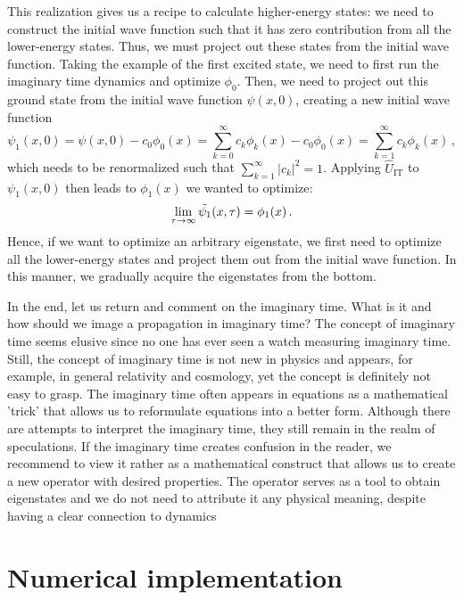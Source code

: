 This realization gives us a recipe to calculate higher-energy states: we need to construct the initial wave function such that it has zero contribution from all the lower-energy states. Thus, we must project out these states from the initial wave function. Taking the example of the first excited state, we need to first run the imaginary time dynamics and optimize $\phi_0$. Then, we need to project out this ground state from the initial wave function $\psi(x,0)$, creating a new initial wave function
\begin{equation}
    \psi_1(x,0) = \psi(x,0) - c_0 \phi_0(x) = \sum_{k=0}^\infty c_k \phi_k(x) - c_0 \phi_0(x) = \sum_{k=1}^\infty c_k \phi_k(x) \, ,
\end{equation}
which needs to be renormalized such that $\sum_{k=1}^\infty |c_k|^2 = 1$. Applying $\hat{U}_\mathrm{IT}$ to $\psi_1(x,0)$ then leads to $\phi_1(x)$ we wanted to optimize:
\begin{equation}
    \lim_{\tau\to\infty} \Tilde{\psi_1}(x,\tau) = \phi_1(x) \, .
\end{equation}
Hence, if we want to optimize an arbitrary eigenstate, we first need to optimize all the lower-energy states and project them out from the initial wave function. In this manner, we gradually acquire the eigenstates from the bottom.

In the end, let us return and comment on the imaginary time. What is it and how should we image a propagation in imaginary time? The concept of imaginary time seems elusive since no one has ever seen a watch measuring imaginary time. Still, the concept of imaginary time is not new in physics and appears, for example, in general relativity and cosmology, yet the concept is definitely not easy to grasp. The imaginary time often appears in equations as a mathematical 'trick' that allows us to reformulate equations into a better form. Although there are attempts to interpret the imaginary time, they still remain in the realm of speculations. If the imaginary time creates confusion in the reader, we recommend to view it rather as a mathematical construct that allows us to create a new operator with desired properties. The operator serves as a tool to obtain eigenstates and we do not need to attribute it any physical meaning, despite having a clear connection to dynamics


\section{Numerical implementation}

